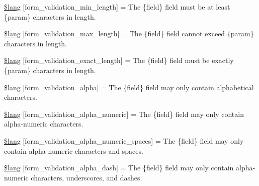 \begin{DoxyCompactItemize}
\item 
\hyperlink{_admin_2system_2language_2english_2form__validation__lang_8php_a8af94ce29e8a4ac82c976c891b51ffc9}{\$lang} \mbox{[}\textquotesingle{}form\+\_\+validation\+\_\+min\+\_\+length\textquotesingle{}\mbox{]} = \textquotesingle{}The \{field\} field must be at least \{param\} characters in length.\textquotesingle{}
\item 
\hyperlink{_admin_2system_2language_2english_2form__validation__lang_8php_a16f2322f1cb6a1db7a2492d653559522}{\$lang} \mbox{[}\textquotesingle{}form\+\_\+validation\+\_\+max\+\_\+length\textquotesingle{}\mbox{]} = \textquotesingle{}The \{field\} field cannot exceed \{param\} characters in length.\textquotesingle{}
\item 
\hyperlink{_admin_2system_2language_2english_2form__validation__lang_8php_ad6d3daf6617c3906bc88d6801e74c6c5}{\$lang} \mbox{[}\textquotesingle{}form\+\_\+validation\+\_\+exact\+\_\+length\textquotesingle{}\mbox{]} = \textquotesingle{}The \{field\} field must be exactly \{param\} characters in length.\textquotesingle{}
\item 
\hyperlink{_admin_2system_2language_2english_2form__validation__lang_8php_a27ff6ba34db740db678c05baa95077bf}{\$lang} \mbox{[}\textquotesingle{}form\+\_\+validation\+\_\+alpha\textquotesingle{}\mbox{]} = \textquotesingle{}The \{field\} field may only contain alphabetical characters.\textquotesingle{}
\item 
\hyperlink{_admin_2system_2language_2english_2form__validation__lang_8php_ad76e433e4991ed7404c0d44ab47119c0}{\$lang} \mbox{[}\textquotesingle{}form\+\_\+validation\+\_\+alpha\+\_\+numeric\textquotesingle{}\mbox{]} = \textquotesingle{}The \{field\} field may only contain alpha-\/numeric characters.\textquotesingle{}
\item 
\hyperlink{_admin_2system_2language_2english_2form__validation__lang_8php_a8909b4a4c25b40e7ed1a27cc5b299d90}{\$lang} \mbox{[}\textquotesingle{}form\+\_\+validation\+\_\+alpha\+\_\+numeric\+\_\+spaces\textquotesingle{}\mbox{]} = \textquotesingle{}The \{field\} field may only contain alpha-\/numeric characters and spaces.\textquotesingle{}
\item 
\hyperlink{_admin_2system_2language_2english_2form__validation__lang_8php_a95a401451435c56b9792be96ffa1bb36}{\$lang} \mbox{[}\textquotesingle{}form\+\_\+validation\+\_\+alpha\+\_\+dash\textquotesingle{}\mbox{]} = \textquotesingle{}The \{field\} field may only contain alpha-\/numeric characters, underscores, and dashes.\textquotesingle{}
\item 

\end{DoxyCompactItemize}

